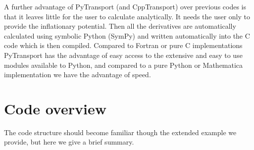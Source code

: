 \documentclass[10pt,
amsmath,amssymb,
aps,prd,nofootinbib,eqsecnum,a4paper]{revtex4}
\newcommand{\CC}{C\nolinebreak\hspace{-.05em}\raisebox{.4ex}{\tiny\bf +}\nolinebreak\hspace{-.10em}\raisebox{.4ex}{\tiny\bf +}}
\def\CC{{C\nolinebreak[4]\hspace{-.05em}\raisebox{.4ex}{\tiny\bf ++}}}
\def\S{ }
\begin{document}
A further advantage of PyTransport (and CppTransport) over previous codes is that it leaves
little for the user to calculate analytically. 
It needs the user only 
to provide the inflationary potential. Then all the derivatives are automatically calculated using 
symbolic Python (SymPy) and written automatically into the \CC \S  code which is then compiled. 
Compared to Fortran or pure \CC \S  
implementations PyTransport 
has the advantage of easy access to the extensive and easy to use modules available to 
Python, and compared to a pure Python or Mathematica implementation we have the advantage of speed.


\section{ Code overview} 

\noindent  The code structure should become familiar though the extended example we provide, but here we give a brief summary. 
\end{document}
